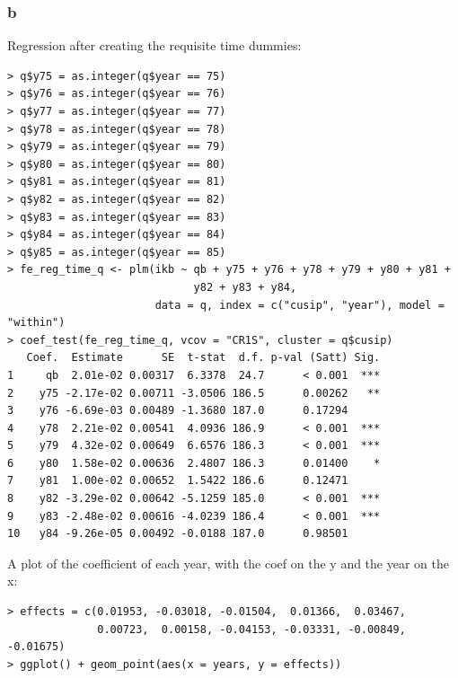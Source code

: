 \documentclass[12pt,letterpaper]{article}
\theoremstyle{definition}
\begin{document}
\subsubsection*{b}

Regression after creating the requisite time dummies:
\begin{Verbatim}[fontsize=\small]
> q$y75 = as.integer(q$year == 75)
> q$y76 = as.integer(q$year == 76)
> q$y77 = as.integer(q$year == 77)
> q$y78 = as.integer(q$year == 78)
> q$y79 = as.integer(q$year == 79)
> q$y80 = as.integer(q$year == 80)
> q$y81 = as.integer(q$year == 81)
> q$y82 = as.integer(q$year == 82)
> q$y83 = as.integer(q$year == 83)
> q$y84 = as.integer(q$year == 84)
> q$y85 = as.integer(q$year == 85)
> fe_reg_time_q <- plm(ikb ~ qb + y75 + y76 + y78 + y79 + y80 + y81 +
                             y82 + y83 + y84,
                       data = q, index = c("cusip", "year"), model = "within")
> coef_test(fe_reg_time_q, vcov = "CR1S", cluster = q$cusip)
   Coef.  Estimate      SE  t-stat  d.f. p-val (Satt) Sig.
1     qb  2.01e-02 0.00317  6.3378  24.7      < 0.001  ***
2    y75 -2.17e-02 0.00711 -3.0506 186.5      0.00262   **
3    y76 -6.69e-03 0.00489 -1.3680 187.0      0.17294
4    y78  2.21e-02 0.00541  4.0936 186.9      < 0.001  ***
5    y79  4.32e-02 0.00649  6.6576 186.3      < 0.001  ***
6    y80  1.58e-02 0.00636  2.4807 186.3      0.01400    *
7    y81  1.00e-02 0.00652  1.5422 186.6      0.12471
8    y82 -3.29e-02 0.00642 -5.1259 185.0      < 0.001  ***
9    y83 -2.48e-02 0.00616 -4.0239 186.4      < 0.001  ***
10   y84 -9.26e-05 0.00492 -0.0188 187.0      0.98501
\end{Verbatim}

A plot of the coefficient of each year, with the coef on the y and the year on the x:
\begin{Verbatim}[fontsize=\small]
> effects = c(0.01953, -0.03018, -0.01504,  0.01366,  0.03467,
              0.00723,  0.00158, -0.04153, -0.03331, -0.00849, -0.01675)
> ggplot() + geom_point(aes(x = years, y = effects))
\end{Verbatim}
\end{document}
